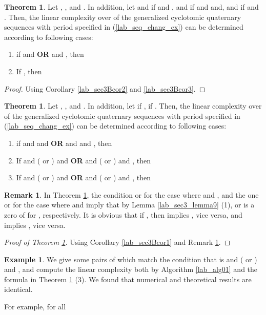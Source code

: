 \documentclass{mcom-l}
\theoremstyle{definition}
\newtheorem{sec3_B_remark4}[sec3_remark1]{Remark}
\newtheorem{sec3thm2aux2}[sec3thm1]{Theorem}
\newtheorem{sec3thm2x}[sec3thm1]{Theorem}
\newtheorem{sec3Bexp1}[sec3exp1]{Example}
\numberwithin{equation}{section}
\begin{document}
  \begin{sec3thm2aux2}\label{lab_sec3thm2aux2}
  Let , ,  and . In addition, let  and  if  and ,  and  if  and  and,  and  if  and . Then, the linear complexity over  of the generalized cyclotomic quaternary sequences with period  specified in (\ref{lab_seq_chang_ex}) can be determined according to following cases:
  \begin{enumerate} \item if  and  \textbf{OR}  and , then
      
\item If , then 
       
\end{enumerate}
    \end{sec3thm2aux2}
  \begin{proof}
   Using  Corollary \ref{lab_sec3Bcor2} and \ref{lab_sec3Bcor3}.
   \end{proof}  
     \begin{sec3thm2x}\label{lab_MainThorem_02x}
       Let , ,  and . In addition, let  if  ,   if . Then, the linear complexity over  of the generalized cyclotomic quaternary sequences with period  specified in (\ref{lab_seq_chang_ex}) can be determined according to following cases:
     \begin{enumerate} \item if  and  and  \textbf{OR }   and  and , then 
     
\item If  and ( or ) and  \textbf{OR}  and ( or ) and , then 
      
\item If  and ( or ) and  \textbf{OR}  and ( or ) and , then 
         
\end{enumerate}
       \end{sec3thm2x}
   \begin{sec3_B_remark4}\label{Lab_sec3_B_remark4}
   In Theorem \ref{lab_MainThorem_02x}, the condition  or  for the case where  and , and the one   or  for the case where  and  imply that by Lemma \ref{lab_sec3_lemma9} (1),  or  is a zero of  for , respectively. It is obvious that if , then  implies , vice versa, and  implies , vice versa.
   \end{sec3_B_remark4}
   \begin{proof}[Proof of Theorem \ref{lab_MainThorem_02x}]
     Using  Corollary \ref{lab_sec3Bcor1} and Remark \ref{Lab_sec3_B_remark4}.
   \end{proof}  
   \begin{sec3Bexp1}\label{lab_sec3Bexp1}
   We give some pairs of  which match the condition that is  and ( or ) and , and compute the linear complexity both by Algorithm \ref{lab_alg01} and the formula in Theorem \ref{lab_MainThorem_02x} (3). We found that numerical and theoretical results are identical.
   
   \end{sec3Bexp1}
    For example, for all 
    
\end{document}
